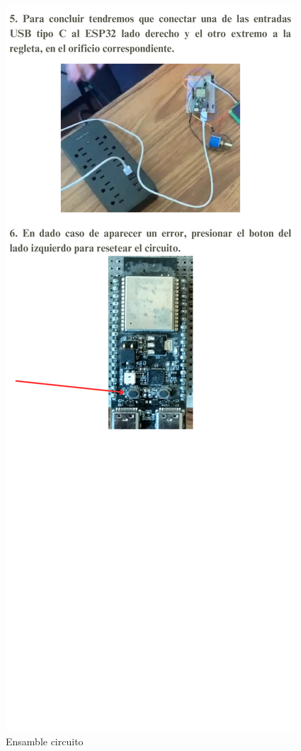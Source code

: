     \begin{figure}
        \centering
    \includegraphics[trim = {20mm 100mm 20mm 0mm},clip,scale=0.150]{24/Img/circuitoElectricoinstructivo2.pdf}
        \caption{Ensamble circuito}
        \label{fig:circuitoelectrico}
    \end{figure}
